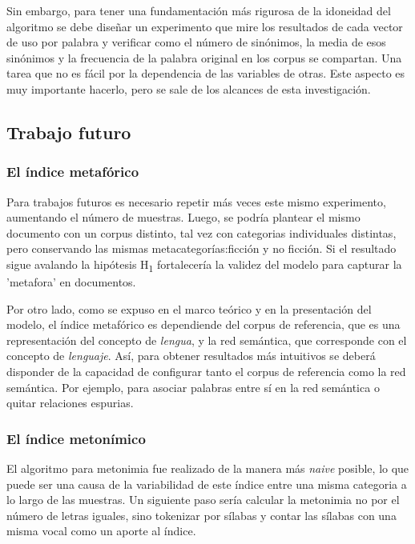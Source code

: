 \documentclass[12pt,letterpaper,twoside]{article}
\begin{document}
Sin embargo, para tener una fundamentación más rigurosa de la
idoneidad del algoritmo se debe diseñar un experimento que mire los
resultados de cada vector de uso por palabra y verificar como el
número de sinónimos, la media de esos sinónimos y la frecuencia de la
palabra original en los corpus se compartan. Una tarea que no es fácil
por la dependencia de las variables de otras. Este aspecto es muy
importante hacerlo, pero se sale de los alcances de esta
investigación.



\subsection{Trabajo futuro}
\label{sec:orgd872a16}

\subsubsection{El índice metafórico}
\label{sec:orgcd0fd97}
Para trabajos futuros es necesario repetir más veces este mismo experimento, aumentando el número de muestras.
Luego, se podría plantear el mismo documento con un corpus distinto, tal vez con categorias individuales
distintas, pero conservando las mismas metacategorías:ficción y no ficción. Si el resultado sigue
avalando la hipótesis H\textsubscript{1} fortalecería la validez del modelo para capturar la 'metafora' en documentos.

Por otro lado, como se expuso en el marco teórico y en la presentación del modelo, el índice metafórico
es dependiende del corpus de referencia, que es una representación del concepto de \emph{lengua}, y la
red semántica, que corresponde con el concepto de \emph{lenguaje}. Así, para obtener resultados más
intuitivos se deberá disponder de la capacidad de configurar tanto el corpus de referencia como la
red semántica. Por ejemplo, para asociar palabras entre sí en la red semántica o quitar relaciones
espurias.


\subsubsection{El índice metonímico}
\label{sec:org1a8da06}

El algoritmo para metonimia fue realizado de la manera más \emph{naive} posible, lo que puede ser una causa
de la variabilidad de este índice entre una misma categoria a lo largo de las muestras. Un siguiente
paso sería calcular la metonimia no por el número de letras iguales, sino tokenizar por sílabas y contar
las sílabas con una misma vocal como un aporte al índice.
\end{document}
